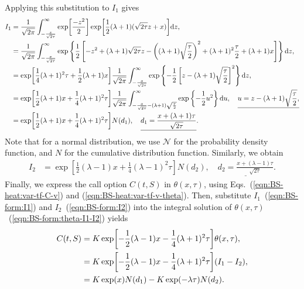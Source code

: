 \documentclass{book}
\begin{document}
Applying this substitution to $I_1$ gives
\begin{align}
    I_1 &= \frac{1}{\sqrt{2\pi}}\int_{-\frac{x}{\sqrt{2\tau}}}^\infty 
    \exp[\frac{-z^2}{2}]
    \exp[\frac{1}{2}(\lambda + 1) (\sqrt{2\tau} z + x)]
    \dd z, \notag\\
    &= \frac{1}{\sqrt{2\pi}}\int_{-\frac{x}{\sqrt{2\tau}}}^\infty 
    \exp\left\{\frac{1}{2} 
    \left[-z^2 + (\lambda + 1) \sqrt{2\tau} z - \left((\lambda + 1)\sqrt{\frac{\tau}{2}}\right)^2 
    + (\lambda + 1)^2\frac{\tau}{2} + (\lambda + 1) x\right]
    \right\}\dd z, \notag\\
    &= 
    \exp[\frac{1}{4}(\lambda + 1)^2 \tau + \frac{1}{2} (\lambda + 1) x]
    \frac{1}{\sqrt{2\pi}}
    \int_{-\frac{x}{\sqrt{2\tau}}}^\infty 
    \exp\left\{
     -\frac{1}{2}\left[ z - (\lambda + 1)\sqrt{\frac{\tau}{2}}\right]^2 
    \right\}\dd z, \notag\\
    &= 
    \exp[\frac{1}{2} (\lambda + 1) x + \frac{1}{4}(\lambda + 1)^2 \tau]
    \frac{1}{\sqrt{2\pi}}
    \int_{-\frac{x}{\sqrt{2\tau}} - (\lambda + 1)\sqrt{\frac{\tau}{2}}}^\infty 
    \exp\left\{
     -\frac{1}{2}u ^2 
    \right\}\dd u, \quad \underline{u = z - (\lambda + 1)\sqrt{\frac{\tau}{2}},}\notag\\
    &= 
    \exp[\frac{1}{2} (\lambda + 1) x + \frac{1}{4}(\lambda + 1)^2 \tau]
    N(d_1),
    \quad \underline{d_1 = \frac{x + (\lambda + 1) \tau}{\sqrt{2\tau}}}.
    \label{eqn:BS-form:I1}
\end{align}
Note that for a normal distribution, we use $\mathcal{N}$ for the  probability density function, and $N$ for the cumulative distribution function. Similarly, we obtain
\begin{align}
    I_2 &= \exp[\frac{1}{2} (\lambda - 1) x + \frac{1}{4}(\lambda - 1)^2 \tau]
    N(d_2),
    \quad \underline{d_2 = \frac{x + (\lambda - 1) \tau}{\sqrt{2\tau}}}.
    \label{eqn:BS-form:I2}
\end{align}
Finally, we express the call option $C(t,S)$ in $\theta(x,\tau)$, using Eqs.~(\ref{eqn:BS-heat:var-tf-C-v}) and (\ref{eqn:BS-heat:var-tf-v-theta}). 
Then, substitute $I_1$~(\ref{eqn:BS-form:I1}) and $I_2$~(\ref{eqn:BS-form:I2}) into the integral solution of $\theta(x,\tau)$~(\ref{eqn:BS-form:theta-I1-I2}) yields
\begin{align}
    C(t,S) 
    &= K \exp[-\frac{1}{2} (\lambda - 1) x  -\frac{1}{4} (\lambda + 1)^2 \tau] \theta(x, \tau), \notag\\
    &= K \exp[-\frac{1}{2} (\lambda - 1) x -\frac{1}{4} (\lambda + 1)^2 \tau] (I_1 - I_2), \notag\\
    &= K \exp(x) N(d_1) - K \exp(-\lambda \tau) N(d_2). \notag
\end{align}
\end{document}
